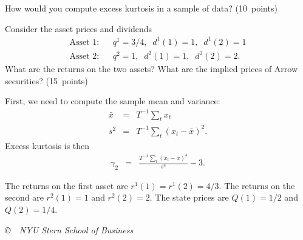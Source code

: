 \documentclass[11pt]{exam}
\begin{document}
\begin{questions}
\begin{solution}
\begin{parts}
\end{parts}
\end{solution}


\begin{parts}
\item How would you compute excess kurtosis in a sample of data?
(10~points)
\item Consider the asset prices and dividends
\begin{eqnarray*}
    \mbox{Asset 1:}&&  q^1 = 3/4, \;\; d^1(1) = 1, \;\; d^1(2) = 1 \\
    \mbox{Asset 2:}&&  q^2 = 1, \;\; d^2(1) = 1, \;\; d^2(2) = 2.
\end{eqnarray*}
What are the returns on the two assets?
What are the implied prices of Arrow securities?
(15~points)
\end{parts}

\begin{solution}
\begin{parts}
\item First, we need to compute the sample mean and variance:
\begin{eqnarray*}
    \bar{x} &=& T^{-1} \sum_t x_t \\
    s^2  &=& T^{-1} \sum_t (x_t -\bar{x})^2 .
\end{eqnarray*}
Excess kurtosis is then
\begin{eqnarray*}
    \gamma_2  &=& \frac{T^{-1} \sum_t (x_t -\bar{x})^4} {s^4} - 3.
\end{eqnarray*}

\item The returns on the first asset are
$ r^1(1) = r^1(2) = 4/3$.
The returns on the second are
$ r^2(1) = 1$ and $r^2(2) = 2$.
The state prices are $Q(1) = 1/2$ and $Q(2) = 1/4$.
\end{parts}
\end{solution}


\end{questions}

\vfill \centerline{\it \copyright \ \number\year \
NYU Stern School of Business}
\end{document}
